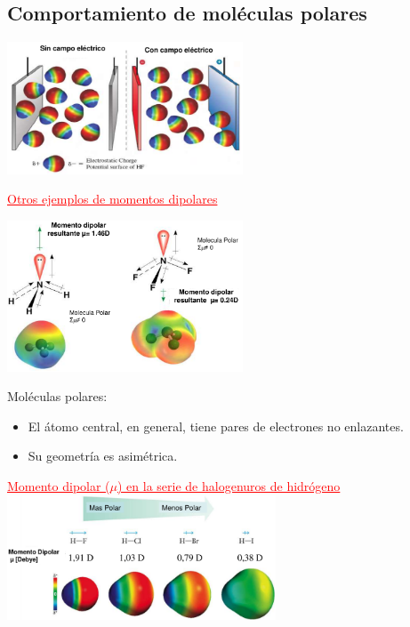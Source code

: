     \subsection{Comportamiento de moléculas polares}
        \begin{center} \includegraphics[width=7cm]{./imagenes/comportamientoMoleculasPolares.png} \end{center}
        \begin{center} \textcolor{red}{\underline{Otros ejemplos de momentos dipolares}} \end{center}
        \begin{center} \includegraphics[width=7cm]{./imagenes/geometriaMomentoDipolar.png} \end{center}
        \sangria{} Moléculas polares:
        \begin{itemize} 
            \item El átomo central, en general, tiene pares de electrones no enlazantes.
            \item Su geometría es asimétrica.
        \end{itemize}
        \begin{center} \textcolor{red}{\underline{Momento dipolar ($\mu$) en la serie de halogenuros de hidrógeno}} \\[10pt] \includegraphics[width=8cm]{./imagenes/momentoDipolarHalogenurosHidrogeno.png} \end{center} 
